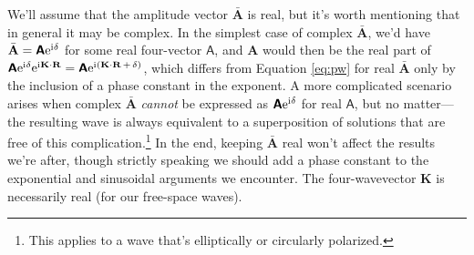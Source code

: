 \documentclass[12pt]{article}
\renewcommand{\vv}[1]{\mathbf{#1}}
\begin{document}
We'll assume that the amplitude vector $\bar{\vv A}$ is real, but it's worth mentioning that in general it may be complex. In the simplest case of complex $\bar{\vv A}$, we'd have $\bar{\vv A} = \bm{\mathsf{A}} \mathrm{e}^{\mathrm{i} \mkern.5mu \delta}$ for some real four-vector $\bm{\mathsf{A}}$, and $\vv A$ would then be the real part of ${\bm{\mathsf{A}} \mathrm{e}^{\mathrm{i} \mkern.5mu \delta} \mathrm{e}^{\mathrm{i} \mkern.5mu \vv K \cdot \vv R} = \bm{\mathsf{A}} \mathrm{e}^{\mathrm{i} \mkern.5mu ( \vv K \cdot \vv R \, + \, \delta )}}$, which differs from Equation \ref{eq:pw} for real $\bar{\vv A}$ only by the inclusion of a phase constant in the exponent. A more complicated scenario arises when complex $\bar{\vv A}$ \emph{cannot} be expressed as $\bm{\mathsf{A}} \mathrm{e}^{\mathrm{i} \mkern.5mu \delta}$ for real $\bm{\mathsf{A}}$, but no matter---the resulting wave is always equivalent to a superposition of solutions that are free of this complication.\footnote{\label{fn:pol}This applies to a wave that's elliptically or circularly polarized.} In the end, keeping $\bar{\vv A}$ real won't affect the results we're after, though strictly speaking we should add a phase constant to the exponential and sinusoidal arguments we encounter. The four-wavevector $\vv K$ is necessarily real (for our free-space waves).
\end{document}
